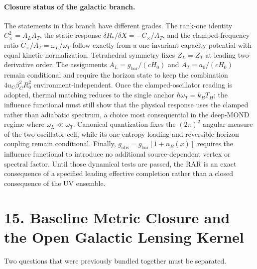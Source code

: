 \documentclass[11pt]{article}
\begin{document}
\paragraph{Closure status of the galactic branch.}
The statements in this branch have different grades. The rank-one identity $C_\times^2=A_LA_T$, the static response $\delta R_*/\delta X=-C_\times/A_T$, and the clamped-frequency ratio $C_\times/A_T=\omega_L/\omega_T$ follow exactly from a one-invariant capacity potential with equal kinetic normalization. Tetrahedral symmetry fixes $Z_L=Z_T$ at leading two-derivative order. The assignments $A_L=g_{\mathrm{bar}}/(cH_0)$ and $A_T=a_0/(cH_0)$ remain conditional and require the horizon state to keep the combination $4u_C\beta_C^2R_0^2$ environment-independent. Once the clamped-oscillator reading is adopted, thermal matching reduces to the single anchor $\hbar\omega_T=k_BT_H$; the influence functional must still show that the physical response uses the clamped rather than adiabatic spectrum, a choice most consequential in the deep-MOND regime where $\omega_L\ll\omega_T$. Canonical quantization fixes the $(2\pi)^2$ angular measure of the two-oscillator cell, while its one-entropy loading and reversible horizon coupling remain conditional. Finally, $g_{\mathrm{obs}}=g_{\mathrm{bar}}[1+n_B(x)]$ requires the influence functional to introduce no additional source-dependent vertex or spectral factor. Until those dynamical tests are passed, the RAR is an exact consequence of a specified leading effective completion rather than a closed consequence of the UV ensemble.

\section{15. Baseline Metric Closure and the Open Galactic Lensing Kernel}

Two questions that were previously bundled together must be separated.
\end{document}
